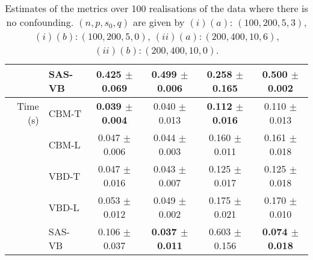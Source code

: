 \documentclass[11pt]{article}
\numberwithin{equation}{section}
\begin{document}
\begin{table}
{\begin{tabular}{r|l|cc|cc}
                & SAS-VB          & 0.425 $\pm$ 0.069          & 0.499 $\pm$ 0.006          & 0.258 $\pm$ 0.165          & \textbf{0.500 $\pm$ 0.002}           \\ \hline
Time (s)        & CBM-T           & \textbf{0.039 $\pm$ 0.004} & 0.040 $\pm$ 0.013          & \textbf{0.112 $\pm$ 0.016} & 0.110 $\pm$ 0.013             \\
                & CBM-L           & 0.047 $\pm$ 0.006          & 0.044 $\pm$ 0.003          & 0.160 $\pm$ 0.011          & 0.161 $\pm$ 0.018             \\
                & VBD-T         & 0.047 $\pm$ 0.016          & 0.043 $\pm$ 0.007          & 0.125 $\pm$ 0.017          & 0.125 $\pm$ 0.018             \\
                & VBD-L         & 0.053 $\pm$ 0.012          & 0.049 $\pm$ 0.002          & 0.175 $\pm$ 0.021          & 0.170 $\pm$ 0.010             \\
                & SAS-VB          & 0.106 $\pm$ 0.037          & \textbf{0.037 $\pm$ 0.011} & 0.603 $\pm$ 0.156          & \textbf{0.074 $\pm$ 0.018}           \\
\bottomrule
\end{tabular}
}
\caption{Estimates of the metrics over 100 realisations of the data where there is no confounding. $(n, p, s_0, q)$ are given by $(i)(a)$: $(100, 200, 5, 3)$, $(i)(b): (100, 200, 5, 0)$, $(ii)(a): (200, 400, 10, 6)$, $(ii)(b): (200, 400, 10, 0)$.}\label{Tab:est_no_confounding}
\end{table}
\end{document}
